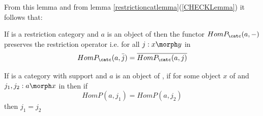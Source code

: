 From this lemma and from lemma \ref{restrictioncatlemma}(\ref{CHECKLemma}) it follows that:
\begin{corollary}
If \catcw is a restriction category  and $a$ is an object of \catcw 
then the functor $HomP_\catc(a,-)$ preserves the restriction operator i.e.
for all $j:x \morph y$ in \catc
$$HomP_\catc(a,\bar{j})=\overline{HomP_\catc(a,j)}$$
\end{corollary}

\begin{lemma}
If \catcw is a category with support
and $a$ is an object of \catc, 
if for some object $x$ of \catcw and
$j_1, j_2: a \morph x$ in \catcw 
then if 
\begin{equation}
\label{HomPIdentity}
HomP(a,j_1)=HomP(a,j_2)
\end{equation}
then $j_1=j_2$
\end{lemma}

